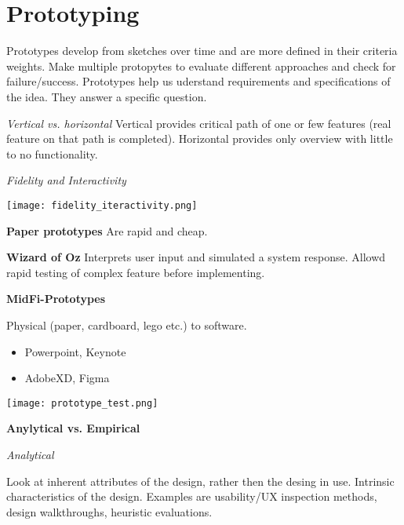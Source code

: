 \section{Prototyping}


Prototypes develop from sketches over time and are more defined in their criteria weights. 
Make multiple protopytes to evaluate different approaches and check for failure/success. Prototypes help us uderstand requirements and specifications of the idea.
They answer a specific question. \medskip

\textit{Vertical vs. horizontal}
Vertical provides critical path of one or few features (real feature on that path is completed). Horizontal provides only overview with little to no functionality. \medskip

\textit{Fidelity and Interactivity}

\begin{center}
	\texttt{[image: fidelity\_iteractivity.png]}
\end{center}


\textbf{Paper prototypes}
Are rapid and cheap. \medskip

\textbf{Wizard of Oz}
Interprets user input and simulated a system response. Allowd rapid testing of complex feature before implementing. \medskip

\textbf{MidFi-Prototypes}

Physical (paper, cardboard, lego etc.) to software. \medskip

\begin{multicols}{2}
    \begin{itemize}[itemsep=-5pt, topsep=-20pt, leftmargin=*]
	\item Powerpoint, Keynote
	\item AdobeXD, Figma
	\end{itemize}
\end{multicols}



\begin{center}
	\texttt{[image: prototype\_test.png]}
\end{center}


\textbf{Anylytical vs. Empirical} \smallskip

\textit{Analytical} \smallskip

Look at inherent attributes of the design, rather then the desing in use. Intrinsic characteristics of the design. 
Examples are usability/UX inspection methods, design walkthroughs, heuristic evaluations. \medskip

